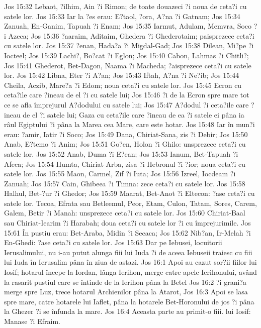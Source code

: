 Jos 15:32  Lebaot, ?ilhim, Ain ?i Rimon; de toate douazeci ?i noua de ceta?i cu satele lor.
Jos 15:33  Iar la ?es erau: E?taol, ?ora, A?na ?i Gatnam;
Jos 15:34  Zanuah, En-Ganim, Tapuah ?i Enam;
Jos 15:35  Iarmut, Adulam, Memvra, Soco ?i Azeca;
Jos 15:36  ?aaraim, Aditaim, Ghedera ?i Ghederotaim; paisprezece ceta?i cu satele lor.
Jos 15:37  ?enan, Hada?a ?i Migdal-Gad;
Jos 15:38  Dilean, Mi?pe ?i Iocteel;
Jos 15:39  Lachi?, Bo?cat ?i Eglon;
Jos 15:40  Cabon, Lahmas ?i Chitli?;
Jos 15:41  Ghederot, Bet-Dagon, Naama ?i Macheda; ?aisprezece ceta?i cu satele lor.
Jos 15:42  Libna, Eter ?i A?an;
Jos 15:43  Iftah, A?na ?i Ne?ib;
Jos 15:44  Cheila, Aczib, Mare?a ?i Edom; noua ceta?i cu satele lor.
Jos 15:45  Ecron cu ceta?ile care ?ineau de el ?i cu satele lui;
Jos 15:46  ?i de la Ecron spre mare tot ce se afla împrejurul A?dodului cu satele lui;
Jos 15:47  A?dodul ?i ceta?ile care ?ineau de el ?i satele lui; Gaza cu ceta?ile care ?ineau de ea ?i satele ei pâna ia râul Egiptului ?i pâna la Marea cea Mare, care este hotar.
Jos 15:48  Iar în mun?i erau: ?amir, Iatir ?i Soco;
Jos 15:49  Dana, Chiriat-Sana, zis ?i Debir;
Jos 15:50  Anab, E?temo ?i Anim;
Jos 15:51  Go?en, Holon ?i Ghilo: unsprezece ceta?i cu satele lor.
Jos 15:52  Anab, Duma ?i E?ean;
Jos 15:53  Ianum, Bet-Tapuah ?i Afeca;
Jos 15:54  Humta, Chiriat-Arba, zisa ?i Hebronul ?i ?ior; noua ceta?i cu satele lor.
Jos 15:55  Maon, Carmel, Zif ?i Iuta;
Jos 15:56  Izreel, Iocdeam ?i Zanuah;
Jos 15:57  Cain, Ghibeea ?i Timna: zece ceta?i cu satele lor.
Jos 15:58  Halhul, Bet-?ur ?i Ghedor;
Jos 15:59  Maarat, Bet-Anot ?i Eltecon: ?ase ceta?i cu satele lor. Tecoa, Efrata sau Betleemul, Peor, Etam, Culon, Tatam, Sores, Carem, Galem, Betir ?i Manah: unsprezece ceta?i cu satele lor.
Jos 15:60  Chiriat-Baal sau Chiriat-Iearim ?i Harabah; doua ceta?i cu satele lor ?i cu împrejurimile.
Jos 15:61  În pustiu erau: Bet-Araba, Midin ?i Secaca;
Jos 15:62  Nib?an, Ir-Melah ?i En-Ghedi: ?ase ceta?i cu satele lor.
Jos 15:63  Dar pe Iebusei, locuitorii Ierusalimului, nu i-au putut alunga fiii lui Iuda ?i de aceea Iebuseii traiesc cu fiii lui Iuda în Ierusalim pâna în ziua de astazi.
Jos 16:1  Apoi au cazut sor?ii fiilor lui Iosif; hotarul începe la Iordan, lânga Ierihon, merge catre apele Ierihonului, având la rasarit pustiul care se întinde de la Ierihon pâna la Betel
Jos 16:2  ?i grani?a merge spre Luz, trece hotarul Archienilor pâna la Atarot,
Jos 16:3  Apoi se lasa spre mare, catre hotarele lui Iaflet, pâna la hotarele Bet-Horonului de jos ?i pâna la Ghezer ?i se înfunda la mare.
Jos 16:4  Aceasta parte au primit-o fiii. lui Iosif: Manase ?i Efraim.
